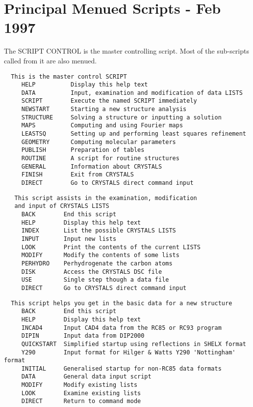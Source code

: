\documentclass[10pt,a4paper]{report}
\begin{document}
\section{Principal Menued Scripts - Feb 1997}
The SCRIPT CONTROL is the master controlling script. Most of the
sub-scripts called from it are also menued.


\bigskip{}


\small\begin{verbatim}
  This is the master control SCRIPT
     HELP          Display this help text
     DATA          Input, examination and modification of data LISTS
     SCRIPT        Execute the named SCRIPT immediately
     NEWSTART      Starting a new structure analysis
     STRUCTURE     Solving a structure or inputting a solution
     MAPS          Computing and using Fourier maps
     LEASTSQ       Setting up and performing least squares refinement
     GEOMETRY      Computing molecular parameters
     PUBLISH       Preparation of tables
     ROUTINE       A script for routine structures
     GENERAL       Information about CRYSTALS
     FINISH        Exit from CRYSTALS
     DIRECT        Go to CRYSTALS direct command input
\end{verbatim}\normalsize




\bigskip{}


\small\begin{verbatim}
   This script assists in the examination, modification
   and input of CRYSTALS LISTS
     BACK        End this script
     HELP        Display this help text
     INDEX       List the possible CRYSTALS LISTS
     INPUT       Input new lists
     LOOK        Print the contents of the current LISTS
     MODIFY      Modify the contents of some lists
     PERHYDRO    Perhydrogenate the carbon atoms
     DISK        Access the CRYSTALS DSC file
     USE         Single step though a data file
     DIRECT      Go to CRYSTALS direct command input
\end{verbatim}\normalsize




\bigskip{}


\small\begin{verbatim}
  This script helps you get in the basic data for a new structure
     BACK        End this script
     HELP        Display this help text
     INCAD4      Input CAD4 data from the RC85 or RC93 program
     DIPIN       Input data from DIP2000
     QUICKSTART  Simplified startup using reflections in SHELX format
     Y290        Input format for Hilger & Watts Y290 'Nottingham' format
     INITIAL     Generalised startup for non-RC85 data formats
     DATA        General data input script
     MODIFY      Modify existing lists
     LOOK        Examine existing lists
     DIRECT      Return to command mode
\end{verbatim}\normalsize
\end{document}
